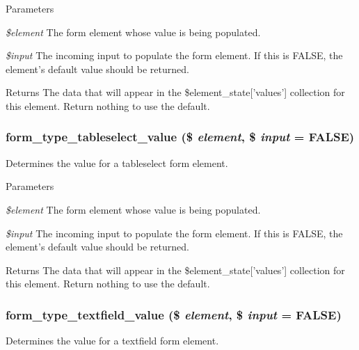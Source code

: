 \begin{DoxyParams}{Parameters}
\item[{\em \$element}]The form element whose value is being populated. \item[{\em \$input}]The incoming input to populate the form element. If this is FALSE, the element's default value should be returned.\end{DoxyParams}
\begin{DoxyReturn}{Returns}
The data that will appear in the \$element\_\-state\mbox{[}'values'\mbox{]} collection for this element. Return nothing to use the default. 
\end{DoxyReturn}
\hypertarget{group__form__api_gad36759844e875d35e1e220e90c460984}{
\subsubsection[{form\_\-type\_\-tableselect\_\-value}]{\setlength{\rightskip}{0pt plus 5cm}form\_\-type\_\-tableselect\_\-value (\$ {\em element}, \/  \$ {\em input} = {\ttfamily FALSE})}}
\label{group__form__api_gad36759844e875d35e1e220e90c460984}
Determines the value for a tableselect form element.


\begin{DoxyParams}{Parameters}
\item[{\em \$element}]The form element whose value is being populated. \item[{\em \$input}]The incoming input to populate the form element. If this is FALSE, the element's default value should be returned.\end{DoxyParams}
\begin{DoxyReturn}{Returns}
The data that will appear in the \$element\_\-state\mbox{[}'values'\mbox{]} collection for this element. Return nothing to use the default. 
\end{DoxyReturn}
\hypertarget{group__form__api_gaf2e351ecad2b3f0a3b319d110bf4b84b}{
\subsubsection[{form\_\-type\_\-textfield\_\-value}]{\setlength{\rightskip}{0pt plus 5cm}form\_\-type\_\-textfield\_\-value (\$ {\em element}, \/  \$ {\em input} = {\ttfamily FALSE})}}
\label{group__form__api_gaf2e351ecad2b3f0a3b319d110bf4b84b}
Determines the value for a textfield form element.


